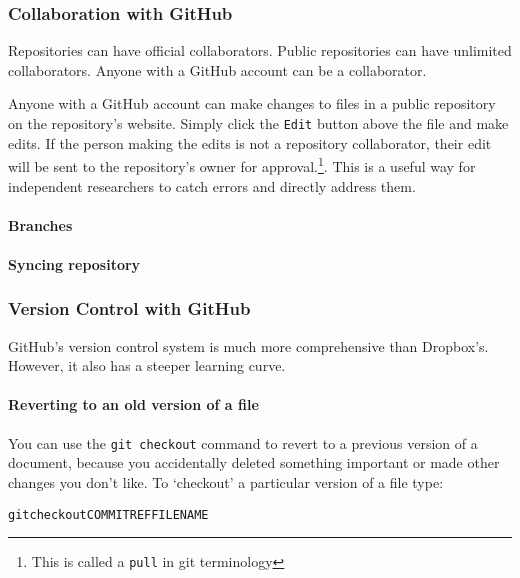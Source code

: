 \subsubsection{Collaboration with GitHub}

Repositories can have official collaborators. Public repositories can have unlimited collaborators. Anyone with a GitHub account can be a collaborator. 
 

Anyone with a GitHub account can make changes to files in a public repository on the repository's website. Simply click the \texttt{Edit} button above the file and make edits. If the person making the edits is not a repository collaborator, their edit will be sent to the repository's owner for approval.\footnote{This is called a \texttt{pull} in git terminology}. This is a useful way for independent researchers to catch errors and directly address them.

\paragraph{Branches}

\paragraph{Syncing repository}

\subsubsection{Version Control with GitHub}

GitHub's version control system is much more comprehensive than Dropbox's. However, it also has a steeper learning curve.

\paragraph{Reverting to an old version of a file}

You can use the {\tt{git checkout}} command to revert to a previous version of a document, because you accidentally deleted something important or made other changes you don't like. To `checkout' a particular version of a file type:

\begin{knitrout}
\color{fgcolor}\begin{kframe}
\begin{alltt}
git checkout COMMITREF FILENAME
\end{alltt}
\end{kframe}
\end{knitrout}


